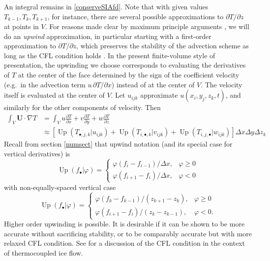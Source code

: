 \documentclass[12pt,final]{amsart}%
\theoremstyle{plain}
\theoremstyle{definition}
\theoremstyle{remark}
\newcommand{\ddx}[1]{\ensuremath{\frac{\partial #1}{\partial x}}}
\newcommand{\ddy}[1]{\ensuremath{\frac{\partial #1}{\partial y}}}
\newcommand{\ddz}[1]{\ensuremath{\frac{\partial #1}{\partial z}}}
\newcommand{\grad}{\nabla}
\newcommand{\Up}{\ensuremath{\operatorname{Up}}}
\def\vf{\varphi}
\newcommand{\bU}{{\mathbf{U}}}
\begin{document}
An integral remains in \eqref{conserveSIAfd}.  Note that with given values $T_{k-1},T_k,T_{k+1}$, for instance, there are several possible approximations to $\partial T/\partial z$ at points in $V$.  For reasons made clear by maximum principle arguments \citep[especially section 4.3]{MortonMayers}, we will do an \emph{upwind} approximation, in particular starting with a first-order approximation to $\partial T/\partial z$, which preserves the stability of the advection scheme as long as the CFL condition holds \citep[section 4.2]{MortonMayers}.  In the present finite-volume style of presentation, the upwinding we choose corresponds to evaluating the derivatives of $T$ at the center of the face determined by the sign of the coefficient velocity (e.g.~in the advection term $u\,\partial T/\partial x$) instead of at the center of $V$.  The velocity itself is evaluated at the center of $V$.  Let $u_{ijk}$ approximate $u(x_i,y_j,z_k,t)$, and similarly for the other components of velocity.  Then
\begin{align*}
\int_V \bU \cdot \grad T &= \int_V u \ddx{T} + v \ddy{T} + w \ddz{T}\\
    &\approx \left[\Up(T_{\bullet,j,k} \big|u_{ijk}) + \Up(T_{i,\bullet,k} \big|v_{ijk}) + \Up(T_{i,j,\bullet} \big|w_{ijk})\right] \Delta x \Delta y \Delta z_k
\end{align*}
Recall from section \ref{numsect} that upwind notation (and its special case for vertical derivatives) is
    $$\Up(f_\bullet\big|\vf) = \begin{cases} \vf(f_i-f_{i-1})/\Delta x, & \vf\ge 0 \\ \vf(f_{i+1}-f_i)/\Delta x, & \vf< 0\end{cases}$$
with non-equally-spaced vertical case
    $$\Up(f_\bullet\big|\vf) = \begin{cases} \vf(f_k-f_{k-1})/(z_{k+1}-z_k), & \vf\ge 0 \\ \vf(f_{i+1}-f_i)/(z_k-z_{k-1}), & \vf< 0.\end{cases}$$
Higher order upwinding \citep{PayneDongelmans} is possible.  It is desirable if it can be shown to be more accurate without sacrificing stability, or to be comparably accurate but with more relaxed CFL condition.  See \citep{BBL} for a discussion of the CFL condition in the context of thermocoupled ice flow.
\end{document}
